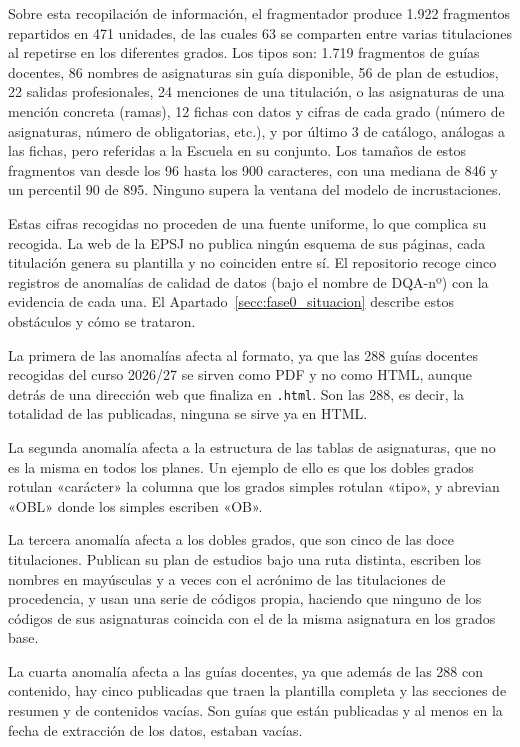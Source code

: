 Sobre esta recopilación de información, el fragmentador produce 1.922 fragmentos repartidos en 471 unidades, de las cuales 63 se comparten entre varias titulaciones al repetirse en los diferentes grados. Los tipos son: 1.719 fragmentos de guías docentes, 86 nombres de asignaturas sin guía disponible, 56 de plan de estudios, 22 salidas profesionales, 24 menciones de una titulación, o las asignaturas de una mención concreta (ramas), 12 fichas con datos y cifras de cada grado (número de asignaturas, número de obligatorias, etc.), y por último 3 de catálogo, análogas a las fichas, pero referidas a la Escuela en su conjunto. Los tamaños de estos fragmentos van desde los 96 hasta los 900 caracteres, con una mediana de 846 y un percentil 90 de 895. Ninguno supera la ventana del modelo de incrustaciones.

Estas cifras recogidas no proceden de una fuente uniforme, lo que complica su recogida. La web de la EPSJ no publica ningún esquema de sus páginas, cada titulación genera su plantilla y no coinciden entre sí. El repositorio recoge cinco registros de anomalías de calidad de datos (bajo el nombre de DQA-nº) con la evidencia de cada una\cite{repo_tfg}. El
  Apartado~\ref{secc:fase0_situacion} describe estos obstáculos y cómo se trataron.

La primera de las anomalías afecta al formato, ya que las 288 guías docentes recogidas del curso 2026/27 se sirven como PDF y no como HTML, aunque detrás de una dirección web que finaliza en \texttt{.html}. Son las 288, es decir, la totalidad de
  las publicadas, ninguna se sirve ya en HTML.

La segunda anomalía afecta a la estructura de las tablas de asignaturas, que no es la misma en todos los planes. Un ejemplo de ello es que los dobles grados rotulan «carácter» la columna
que los grados simples rotulan «tipo», y abrevian «OBL» donde los simples escriben «OB».

La tercera anomalía afecta a los dobles grados, que son cinco de las doce titulaciones. Publican su plan de estudios bajo una ruta distinta, escriben los nombres en mayúsculas y a veces con el acrónimo de las titulaciones de procedencia, y usan una serie de códigos propia, haciendo que ninguno de los códigos de sus asignaturas coincida con el de la misma asignatura en los grados base.

La cuarta anomalía afecta a las guías docentes, ya que además de las 288 con contenido, hay cinco publicadas que traen la plantilla completa y las secciones de resumen y de contenidos vacías. Son guías que están publicadas y al menos en la fecha de extracción de los datos, estaban vacías.


